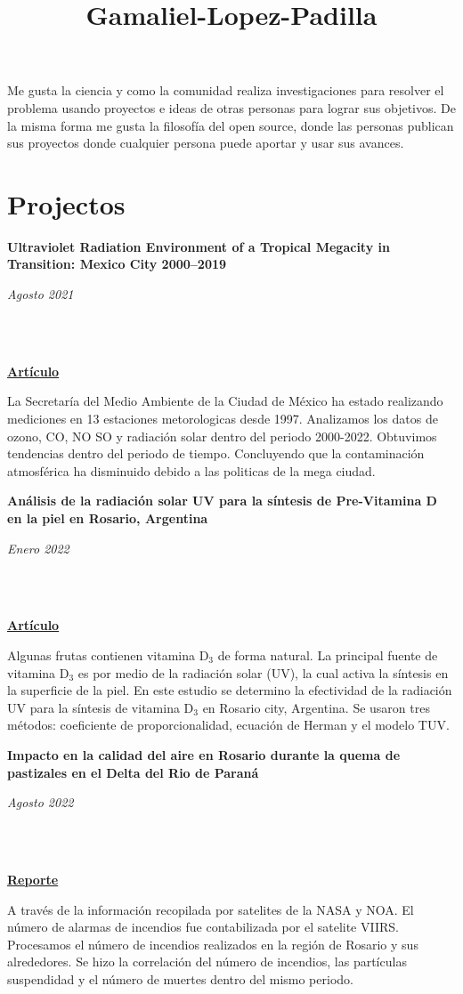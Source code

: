 \documentclass[a3paper]{adcv_color}
\title{Gamaliel-Lopez-Padilla}
\newcommand{\proyect}[3]{\begin{minipage}{1\linewidth}
    \begin{minipage}{0.8\linewidth}
      \textbf{#1}
    \end{minipage}
    \begin{minipage}{0.19\linewidth}
      \begin{flushright}
        \vspace{#3cm}
        \textit{#2}
      \end{flushright}
    \end{minipage}\\
  \end{minipage}
  \vspace{0.1cm}\\
}
\begin{document}
\changefontsizes{15.5pt}
Me gusta la ciencia y como la comunidad realiza investigaciones para resolver el problema usando proyectos e ideas de otras personas para lograr sus objetivos. De la misma forma me gusta la filosofía del open source, donde las personas publican sus proyectos donde cualquier persona puede aportar y usar sus avances.

\section{Projectos}
\begin{multicols}{2}

  \proyect{Ultraviolet Radiation Environment of a Tropical Megacity in Transition: Mexico City 2000–2019}{Agosto 2021}{-0.6}
  \href{https://pubs.acs.org/doi/10.1021/acs.est.0c08515}{\textbf{Artículo}}

  La Secretaría del Medio Ambiente de la Ciudad de México ha estado realizando mediciones en 13 estaciones metorologicas desde 1997. Analizamos los datos de ozono, CO, NO SO y radiación solar dentro del periodo 2000-2022. Obtuvimos tendencias dentro del periodo de tiempo. Concluyendo que la contaminación atmosférica ha disminuido debido a las politicas de la mega ciudad.


  \proyect{Análisis de la radiación solar UV para la síntesis de Pre-Vitamina D en la piel en Rosario, Argentina}{Enero 2022}{-0.8}
  \href{https://anales.fisica.org.ar/journal/index.php/analesafa/article/view/2318}{\textbf{Artículo}}

  Algunas frutas contienen vitamina  D$_3$ de forma natural. La principal fuente de vitamina D$_3$ es por medio de la radiación solar (UV), la cual activa la síntesis en la superficie de la piel. En este estudio se determino la efectividad de la radiación UV para la síntesis de vitamina D$_3$ en Rosario city, Argentina. Se usaron tres métodos: coeficiente de proporcionalidad, ecuación de Herman y el modelo TUV.\\

  \proyect{Impacto en la calidad del aire en Rosario durante la quema de pastizales en el Delta del Rio de Paraná}{Agosto 2022}{-0.6}
  \href{https://rephip.unr.edu.ar/handle/2133/24201}{\textbf{Reporte}}

  A través de la información recopilada por satelites de la NASA y NOA. El número de alarmas de incendios fue contabilizada por el satelite VIIRS. Procesamos el número de incendios realizados en la región de Rosario y sus alrededores. Se hizo la correlación del número de incendios, las partículas suspendidad y el número de muertes dentro del mismo periodo.\\


\end{multicols}
\end{document}

